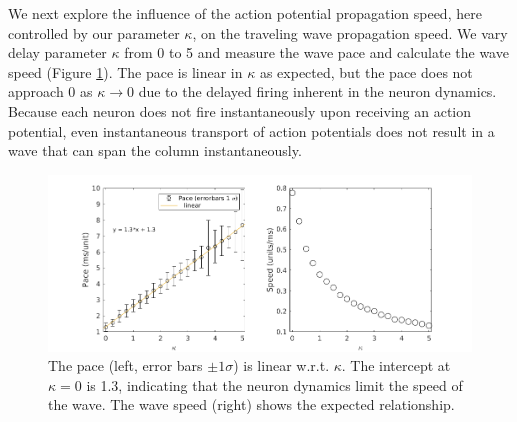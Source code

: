 \documentclass[12pt]{article}
\begin{document}
\FloatBarrier

We next explore the influence of the action potential propagation speed, here controlled by our parameter $\kappa$, on the traveling wave propagation speed.
We vary delay parameter $\kappa$ from 0 to 5 and measure the wave pace and calculate the wave speed (Figure \ref{fig:delay_speed}).
The pace is linear in $\kappa$ as expected, but the pace does not approach $0$ as $\kappa \rightarrow 0$ due to the delayed firing inherent in the neuron dynamics.
Because each neuron does not fire instantaneously upon receiving an action potential, even instantaneous transport of action potentials does not result in a wave that can span the column instantaneously.
\begin{figure}[!htb]
 \caption{The pace (left, error bars $\pm 1 \sigma$) is linear w.r.t. $\kappa$. The intercept at $\kappa=0$ is 1.3, indicating that the neuron dynamics limit the speed of the wave. The wave speed (right) shows the expected relationship. }
 \label{fig:delay_speed}
 \centering
   \includegraphics[width=\textwidth]{fig/WaveSpeed_Delay}
\end{figure}
\color{red} 
\FloatBarrier
\end{document}
